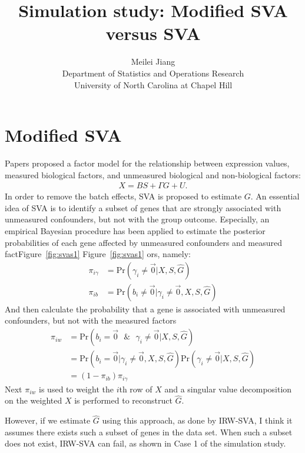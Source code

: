 \documentclass[11pt]{article}
\begin{document}
\author{Meilei Jiang\\
    Department of Statistics and Operations Research\\
		University of North Carolina at Chapel Hill}
\title{Simulation study: Modified SVA versus SVA}

\maketitle
\section{Modified SVA}
Papers \cite{leek2012sva, leek2007capturing, leek2008general} proposed a factor model for the relationship between expression values, measured biological factors, and unmeasured biological and non-biological factors:
$$ \begin{aligned}
X = B S + \Gamma G + U.
\end{aligned}$$
In order to remove the batch effects, SVA is proposed to estimate $G$. An essential idea of SVA is to identify a subset of genes that are strongly associated with unmeasured confounders, but not with the group outcome. Especially, an empirical Bayesian procedure has been applied to estimate the posterior probabilities of each gene affected by unmeasured confounders and measured factFigure~\ref{fig:svas1} Figure~\ref{fig:svas1} ors, namely: 
$$\begin{aligned}
\pi_{i\gamma} &= \text{Pr}( \gamma_i \neq \vec{0}| X, S, \hat{G}) \\
\pi_{i b} &= \text{Pr}(b_i \neq \vec{0} | \gamma_i \neq \vec{0}, X, S, \hat{G}) 
\end{aligned}$$
And then calculate the probability that a gene is associated with unmeasured confounders, but not with the measured factors
$$\begin{aligned}
\pi_{i w} &= \text{Pr}(b_i = \vec{0} \text{ } \& \text{ } \gamma_i \neq \vec{0} | X, S, \hat{G}) \\
&= \text{Pr}(b_i = \vec{0} | \gamma_i \neq \vec{0}, X, S, \hat{G}) \text{Pr}( \gamma_i \neq \vec{0}| X, S, \hat{G}) \\
&= (1 - \pi_{i b})\pi_{i\gamma}                     
\end{aligned}$$
Next $\pi_{i w}$ is used to weight the $i$th row of $X$ and a singular value decomposition on the weighted $X$ is performed to reconstruct $\hat{G}$.

However, if we estimate $\hat{G}$ using this approach, as done by IRW-SVA, I think it assumes there exists such a subset of genes in the data set. When such a subset does not exist, IRW-SVA can fail, as shown in Case 1 of the simulation study.
\end{document}
